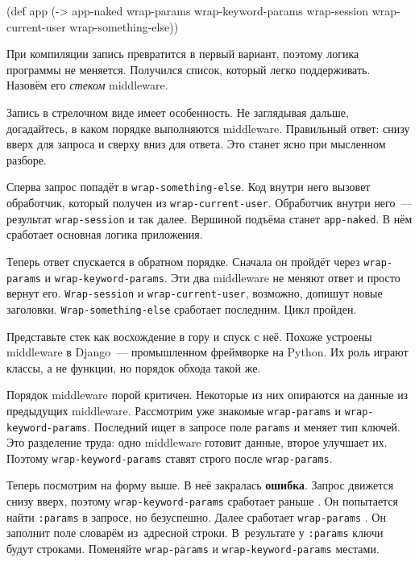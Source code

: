\begin{english}
  \begin{clojure/lines}
(def app
  (-> app-naked
      wrap-params
      wrap-keyword-params
      wrap-session
      wrap-current-user
      wrap-something-else))
  \end{clojure/lines}
\end{english}


При компиляции запись превратится в первый вариант, поэтому логика программы не
меняется. Получился список, который легко поддерживать. Назовём его
\emph{стеком} middleware.

Запись в стрелочном виде имеет особенность. Не заглядывая дальше, догадайтесь, в
каком порядке выполняются middleware. Правильный ответ: снизу вверх для запроса
и сверху вниз для ответа. Это станет ясно при мысленном разборе.


Сперва запрос попадёт в \verb|wrap-something-else|. Код внутри него
вызовет обработчик, который получен из \verb|wrap-current-user|. Обработчик
внутри него~--- результат \verb|wrap-session| и так далее. Вершиной подъёма
станет \verb|app-naked|. В нём сработает основная логика приложения.

Теперь ответ спускается в обратном порядке. Сначала он пройдёт через
\verb|wrap-params| и \verb|wrap-keyword-params|. Эти два middleware не
меняют ответ и просто вернут его. \verb|Wrap-session| и
\verb|wrap-current-user|, возможно, допишут новые заголовки.
\verb|Wrap-something-else| сработает последним. Цикл пройден.


Представьте стек как восхождение в гору и спуск с неё. Похоже устроены
middleware в Django~--- промышленном фреймворке на Python. Их роль играют классы, а
не функции, но порядок обхода такой же.

Порядок middleware порой критичен. Некоторые из них опираются на данные из
предыдущих middleware. Рассмотрим уже знакомые \verb|wrap-params| и
\verb|wrap-keyword-params|. Последний ищет в запросе поле \verb|params| и
меняет тип ключей. Это разделение труда: одно middleware готовит данные, второе
улучшает их. Поэтому \verb|wrap-keyword-params| ставят строго после
\verb|wrap-params|.


Теперь посмотрим на форму  выше. В неё закралась
\textbf{ошибка}. Запрос движется снизу вверх, поэтому \verb|wrap-keyword-params|
сработает раньше . Он попытается найти \verb|:params| в запросе, но
безуспешно. Далее сработает \verb|wrap-params| . Он заполнит поле
словарём из~адресной строки. В~результате у \verb|:params| ключи будут
строками. Поменяйте \verb|wrap-params| и \verb|wrap-keyword-params| местами.


